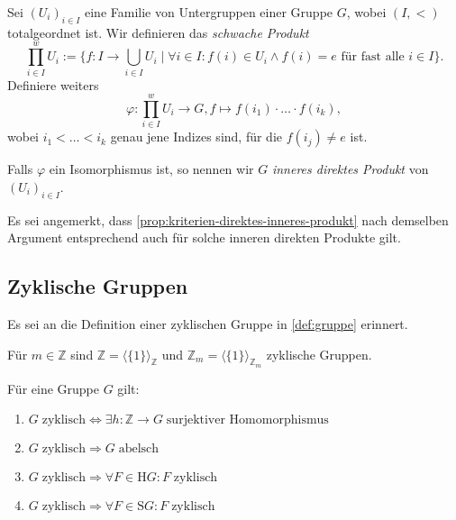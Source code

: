 \begin{remark}
    Sei $(U_i)_{i \in I}$ eine Familie von Untergruppen einer Gruppe $G$, wobei $(I, <)$ totalgeordnet ist. Wir definieren das \emph{schwache Produkt} 
    $$ \prod_{i \in I}^w U_i := \{ f : I \to \bigcup_{i \in I} U_i \mid \forall i \in I: f(i) \in U_i \land f(i) = e \textrm{ für fast alle } i \in I \}. $$
    Definiere weiters
    $$ \varphi : \prod_{i \in I}^w U_i \to G, f \mapsto f(i_1) \cdot \hdots \cdot f(i_k), $$
    wobei $i_1 < \hdots < i_k $ genau jene Indizes sind, für die $f(i_j) \neq e$ ist.

    Falls $\varphi$ ein Isomorphismus ist, so nennen wir $G$ \emph{inneres direktes Produkt} von $(U_i)_{i \in I}$.

    Es sei angemerkt, dass \cref{prop:kriterien-direktes-inneres-produkt} nach demselben Argument entsprechend auch für solche inneren direkten Produkte gilt.
\end{remark}


\subsection{Zyklische Gruppen}

Es sei an die Definition einer zyklischen Gruppe in \cref{def:gruppe} erinnert.

\begin{example}
    Für $m\in\mathbb{Z}$ sind $\mathbb{Z} = \langle \{1\}\rangle_{\mathbb{Z}}$ und $\mathbb{Z}_m = \langle\{1\}\rangle_{\mathbb{Z}_m}$ zyklische Gruppen.
\end{example}

\begin{proposition}\label{prop:zyklische_gruppen_1} Für eine Gruppe $G$ gilt:
    \begin{enumerate}
        \item $G\;\text{zyklisch} \Leftrightarrow \exists h: \mathbb{Z} \to G\;\text{surjektiver Homomorphismus}$
        \item $G\;\text{zyklisch} \Rightarrow G\;\text{abelsch}$
        \item $G\;\text{zyklisch} \Rightarrow \forall F \in \mathrm{H}G: F\;\text{zyklisch}$
        \item $G\;\text{zyklisch} \Rightarrow \forall F \in \mathrm{S}G: F\;\text{zyklisch}$
    \end{enumerate}
\end{proposition}

